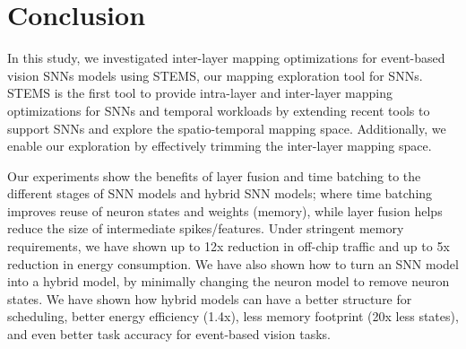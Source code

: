\section{Conclusion} \label{sec:conclusion}

In this study, we investigated inter-layer mapping optimizations for event-based vision SNNs models using STEMS, our mapping exploration tool for SNNs. STEMS is the first tool to provide intra-layer and inter-layer mapping optimizations for SNNs and temporal workloads by extending recent tools to support SNNs and explore the spatio-temporal mapping space. Additionally, we enable our exploration by effectively trimming the inter-layer mapping space.

Our experiments show the benefits of layer fusion and time batching to the different stages of SNN models and hybrid SNN models; where time batching improves reuse of neuron states and weights (memory), while layer fusion helps reduce the size of intermediate spikes/features. Under stringent memory requirements, we have shown up to 12x reduction in off-chip traffic and up to 5x reduction in energy consumption. We have also shown how to turn an SNN model into a hybrid model, by minimally changing the neuron model to remove neuron states. We have shown how hybrid models can have a better structure for scheduling, better energy efficiency (1.4x), less memory footprint (20x less states), and even better task accuracy for event-based vision tasks. 







